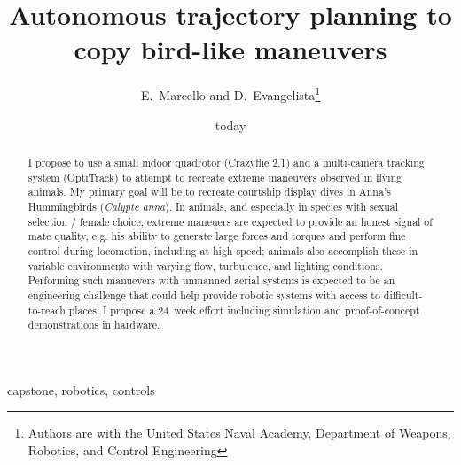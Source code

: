 \documentclass[onecolumn,10pt]{IEEEtran}
\title{Autonomous trajectory planning to copy bird-like maneuvers}
\author{E.~Marcello and D.~Evangelista\thanks{Authors are with the United States Naval Academy, Department of Weapons, Robotics, and Control Engineering}}
\date{today}
\begin{document}
\maketitle

\begin{abstract}
I propose to use a small indoor quadrotor (Crazyflie 2.1) and a multi-camera tracking system (OptiTrack) to attempt to recreate extreme maneuvers observed in flying animals.  My primary goal will be to recreate courtship display dives in Anna's Hummingbirds (\emph{Calypte anna}). In animals, and especially in species with sexual selection / female choice, extreme maneuers are expected to provide an honest signal of mate quality, e.g. his ability to generate large forces and torques and perform fine control during locomotion, including at high speed; animals also accomplish these in variable environments with varying flow, turbulence, and lighting conditions. Performing such manuevers with unmanned aerial systems is expected to be an engineering challenge that could help provide robotic systems with access to difficult-to-reach places. I propose a  \SI{24}{week} effort including simulation and proof-of-concept demonstrations in hardware. 

\end{abstract}

\begin{IEEEkeywords}
capstone, robotics, controls
\end{IEEEkeywords}
\end{document}
